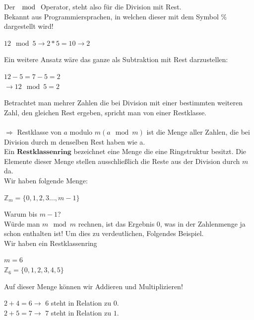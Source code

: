 \documentclass[a4paper,12pt]{scrartcl}
\begin{document}
 Der $\mod$ Operator, steht also für die Division mit Rest.\\ Bekannt aus Programmiersprachen, in welchen dieser mit dem Symbol $\%$ dargestellt wird!
 
 \begin{center}
  $12 \mod 5 \rightarrow 2 * 5 = 10 \rightarrow 2$
 \end{center}
 Ein weitere Ansatz wäre das ganze als Subtraktion mit Rest darzustellen:
 
 \begin{center}
  $12 - 5 = 7 -5 = 2$\\
  $\rightarrow 12 \mod 5 = 2$
 \end{center}
 
 
 Betrachtet man mehrer Zahlen die bei Division mit einer bestimmten weiteren Zahl, den gleichen Rest ergeben, spricht man von einer Restklasse.\\\\
 $\Rightarrow$ Restklasse von $a$ modulo $m (a \mod m)$ ist die Menge aller Zahlen, die bei\\ Division durch m denselben Rest haben wie a.\\


 
 
 

Ein $\textbf {Restklassenring}$ bezeichnet eine Menge die eine Ringstruktur besitzt. Die Elemente dieser Menge stellen  ausschließlich die Reste aus der Division durch $m$ da. \\ Wir haben folgende Menge: 
\begin{center}
  $\mathbb{Z}_{m} = \{0 ,1,2,3.. ., m- 1 \}$ 

 \end{center}

 
 
 Warum bis $m - 1$? \\
 Würde man $m \mod m$ rechnen, ist das Ergebnis 0, was in der Zahlenmenge ja schon enthalten ist! Um dies zu verdeutlichen, Folgendes Beispiel.
\\
Wir haben ein Restklassenring

\begin{center}
$m = 6$\\
 $\mathbb{Z}_{6} = \{0,1,2,3,4,5\}$
\end{center}
Auf dieser Menge können wir Addieren und Multiplizieren! \\
\begin{center}
 $ 2 + 4 = 6 \rightarrow $ $6$ steht in Relation zu $0$.\\
 $2 + 5 = 7 \rightarrow $ $7$ steht in Relation zu $1.$
\end{center}
\end{document}
